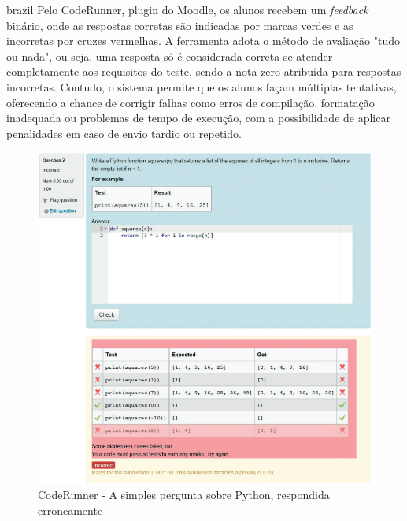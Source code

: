 \begin{otherlanguage*}{brazil}
Pelo CodeRunner, plugin do Moodle, os alunos recebem um \textit{feedback} binário, onde as respostas corretas são indicadas por marcas verdes e as incorretas por cruzes vermelhas. A ferramenta adota o método de avaliação "tudo ou nada", ou seja, uma resposta só é considerada correta se atender completamente aos requisitos do teste, sendo a nota zero atribuída para respostas incorretas. Contudo, o sistema permite que os alunos façam múltiplas tentativas, oferecendo a chance de corrigir falhas como erros de compilação, formatação inadequada ou problemas de tempo de execução, com a possibilidade de aplicar penalidades em caso de envio tardio ou repetido.

\begin{figure}[h!]
	   \centering
            \caption{CodeRunner - A simples pergunta sobre Python, respondida erroneamente}
            \label{fig:ModeloConceitual}
	   	\includegraphics[scale=0.4]{pictures/CodeRunner_errada.png}
\end{figure}


\end{otherlanguage*}
